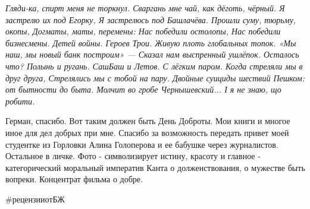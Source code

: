 \begin{center}
\begin{multicols}{2}
\large\color{blue}\em
\obeycr
Гляди-ка, спирт меня не торкнул.
Сваргань мне чай, как дёготь, чёрный.
Я застрелю их под Егорку,
Я застрелюсь под Башлачёва.
Прошли суму, тюрьму, окопы,
Догматы, маты, перемены:
Нас победили остолопы,
Нас победили бизнесмены.
Детей войны. Героев Трои.
Живую плоть глобальных топок.
«Мы наш, мы новый банк построим» —
Сказал нам выспренный ушлёпок.
Осталось что? Полынь и ругань.
СашБаш и Летов. С лёгким паром.
Когда стреляли мы в друг друга,
Стрелялись мы с тобой на пару.
Двойные суициды шествий
Пешком: от бытности до быта.
Молчит во гробе Чернышевский...
І я не знаю, що робити.
\restorecr
\end{multicols}
\end{center}

Герман, спасибо. Вот таким должен быть День Доброты. Мои книги и многое иное
для дел добрых при мне. Спасибо за возможность передать привет моей студентке
из Горловки Алина Голоперова   и ее бабушке  через журналистов. Остальное в
личке. Фото - символизирует истину, красоту и главное - категорический
моральный императив Канта о долженствования, о мужестве быть вопреки.
Концентрат фильма о добре.

 \#рецензииотБЖ
